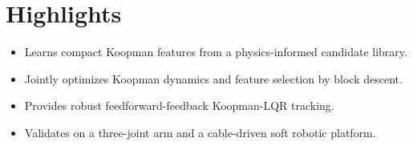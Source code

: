 \documentclass[11pt]{article}
\begin{document}
\section*{Highlights}

\begin{itemize}
\item Learns compact Koopman features from a physics-informed candidate library.
\item Jointly optimizes Koopman dynamics and feature selection by block descent.
\item Provides robust feedforward-feedback Koopman-LQR tracking.
\item Validates on a three-joint arm and a cable-driven soft robotic platform.
\end{itemize}
\end{document}
